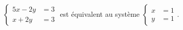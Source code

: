 $\begin{cases}5x-2y &= 3 \\ x+2y &= 3\end{cases}$ est équivalent au système $\begin{cases}x&=1 \\ y&=1\end{cases}$.

\begin{reponses}
\end{reponses}

